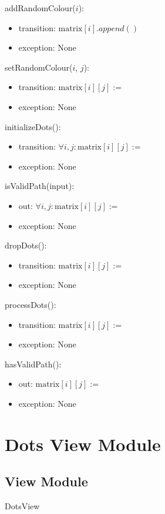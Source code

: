 \documentclass[12pt]{article}
\begin{document}
\noindent addRandomColour($i$):
\begin{itemize}
\item transition: $\mbox{matrix}[i].append()$
\item exception: None
\end{itemize}

\noindent setRandomColour($i$, $j$):
\begin{itemize}
\item transition: $\mbox{matrix}[i][j] := $
\item exception: None
\end{itemize}

\noindent initializeDots():
\begin{itemize}
\item transition: $\forall i, j: \mbox{matrix}[i][j] := $
\item exception: None
\end{itemize}

\noindent isValidPath(input):
\begin{itemize}
\item out: $\forall i, j: \mbox{matrix}[i][j] := $
\item exception: None
\end{itemize}

\noindent dropDots():
\begin{itemize}
\item transition: $\mbox{matrix}[i][j] := $
\item exception: None
\end{itemize}

\noindent processDots():
\begin{itemize}
\item transition: $\mbox{matrix}[i][j] := $
\item exception: None
\end{itemize}

\noindent hasValidPath():
\begin{itemize}
\item out: $\mbox{matrix}[i][j] := $
\item exception: None
\end{itemize}

\newpage

\section* {Dots View Module}

\subsection* {View Module}
DotsView
\end{document}
